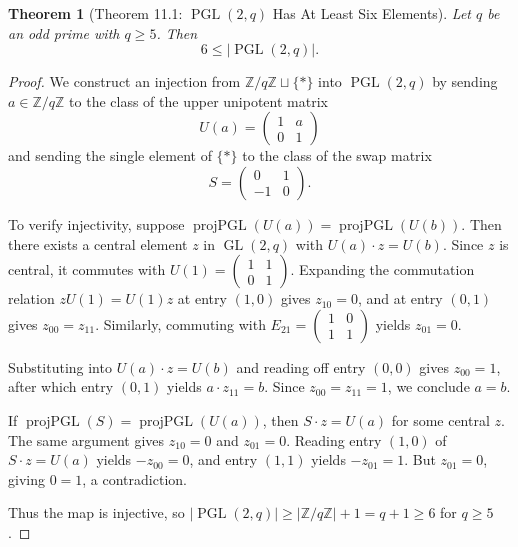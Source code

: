 \documentclass[11pt]{article}
\theoremstyle{plain}
\newtheorem*{theorem}{Theorem}
\theoremstyle{definition}
\theoremstyle{remark}
\begin{document}
\begin{theorem}[Theorem 11.1: $\operatorname{PGL}(2,q)$ Has At Least Six Elements]
Let $q$ be an odd prime with $q \geq 5$. Then
\[
6 \leq |\operatorname{PGL}(2,q)|.
\]
\end{theorem}

\begin{proof}
We construct an injection from $\mathbb{Z}/q\mathbb{Z} \sqcup \{*\}$ into $\operatorname{PGL}(2,q)$ by sending $a \in \mathbb{Z}/q\mathbb{Z}$ to the class of the upper unipotent matrix
\[
U(a) = \begin{pmatrix} 1 & a \\ 0 & 1 \end{pmatrix}
\]
and sending the single element of $\{*\}$ to the class of the swap matrix
\[
S = \begin{pmatrix} 0 & 1 \\ -1 & 0 \end{pmatrix}.
\]

To verify injectivity, suppose $\operatorname{projPGL}(U(a)) = \operatorname{projPGL}(U(b))$. Then there exists a central element $z$ in $\operatorname{GL}(2,q)$ with $U(a) \cdot z = U(b)$. Since $z$ is central, it commutes with $U(1) = \begin{pmatrix}1&1\\0&1\end{pmatrix}$. Expanding the commutation relation $zU(1) = U(1)z$ at entry $(1,0)$ gives $z_{10} = 0$, and at entry $(0,1)$ gives $z_{00} = z_{11}$. Similarly, commuting with $E_{21} = \begin{pmatrix}1&0\\1&1\end{pmatrix}$ yields $z_{01} = 0$. 

Substituting into $U(a) \cdot z = U(b)$ and reading off entry $(0,0)$ gives $z_{00} = 1$, after which entry $(0,1)$ yields $a \cdot z_{11} = b$. Since $z_{00} = z_{11} = 1$, we conclude $a = b$.

If $\operatorname{projPGL}(S) = \operatorname{projPGL}(U(a))$, then $S \cdot z = U(a)$ for some central $z$. The same argument gives $z_{10} = 0$ and $z_{01} = 0$. Reading entry $(1,0)$ of $S \cdot z = U(a)$ yields $-z_{00} = 0$, and entry $(1,1)$ yields $-z_{01} = 1$. But $z_{01} = 0$, giving $0 = 1$, a contradiction.

Thus the map is injective, so $|\operatorname{PGL}(2,q)| \geq |\mathbb{Z}/q\mathbb{Z}| + 1 = q + 1 \geq 6$ for $q \geq 5$.
\end{proof}
\end{document}
